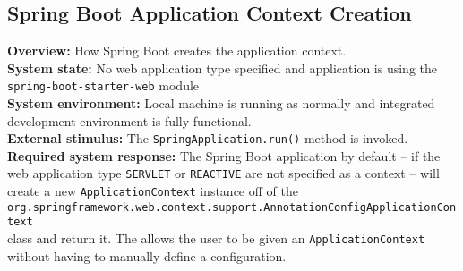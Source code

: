 \subsection*{Spring Boot Application Context Creation}

\textbf{Overview:} How Spring Boot creates the application context.\\

\textbf{System state:} No web application type specified and application is using the \texttt{spring-boot-starter-web} module \\

\textbf{System environment:} Local machine is running as normally and integrated development environment is fully functional. \\

\textbf{External stimulus:} The \texttt{SpringApplication.run()} method is invoked. \\

\textbf{Required system response:} The Spring Boot application by default -- if the web application type \texttt{SERVLET} or \texttt{REACTIVE} are not specified as a context -- will create a new \texttt{ApplicationContext} instance off of the\\ \texttt{org.springframework.web.context.support.AnnotationConfigApplicationContext}\\ class and return it. The allows the user to be given an \texttt{ApplicationContext} without having to manually define a configuration.